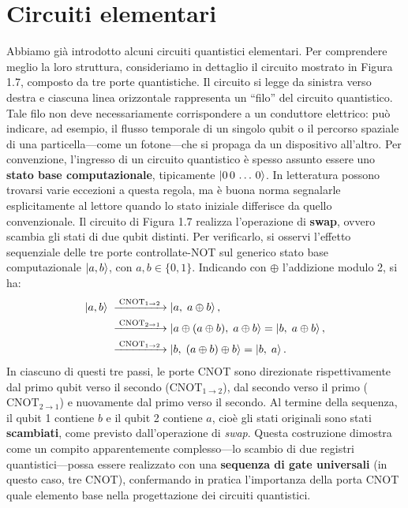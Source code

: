 \documentclass[a4paper,12pt]{report}
\theoremstyle{plain}
\begin{document}
\section{Circuiti elementari}
Abbiamo già introdotto alcuni circuiti quantistici elementari. Per comprendere meglio la loro struttura, consideriamo in dettaglio il circuito mostrato in Figura 1.7, composto da tre porte quantistiche. Il circuito si legge da sinistra verso destra e ciascuna linea orizzontale rappresenta un ``filo'' del circuito quantistico. Tale filo non deve necessariamente corrispondere a un conduttore elettrico: può indicare, ad esempio, il flusso temporale di un singolo qubit o il percorso spaziale di una particella---come un fotone---che si propaga da un dispositivo all'altro.
Per convenzione, l'ingresso di un circuito quantistico è spesso assunto essere uno \textbf{stato base computazionale}, tipicamente $\ket{0\,0\,\dots\,0}$. In letteratura possono trovarsi varie eccezioni a questa regola, ma è buona norma segnalarle esplicitamente al lettore quando lo stato iniziale differisce da quello convenzionale.
Il circuito di Figura 1.7 realizza l'operazione di \textbf{swap}, ovvero scambia gli stati di due qubit distinti. Per verificarlo, si osservi l'effetto sequenziale delle tre porte controllate-NOT sul generico stato base computazionale $\ket{a,b}$, con $a,b\in\{0,1\}$. Indicando con $\oplus$ l'addizione modulo 2, si ha:
\begin{equation}
\begin{aligned}
\ket{a,b} 
&\;\xrightarrow{\;\mathrm{CNOT}_{1\to2}\;} 
\ket{a,\;a \oplus b},\\
&\;\xrightarrow{\;\mathrm{CNOT}_{2\to1}\;} 
\ket{a \oplus (a \oplus b),\;a \oplus b}
   = \ket{b,\;a \oplus b},\\
&\;\xrightarrow{\;\mathrm{CNOT}_{1\to2}\;} 
\ket{b,\;(a \oplus b)\oplus b}
   = \ket{b,\;a}.
\end{aligned}
\end{equation}
In ciascuno di questi tre passi, le porte CNOT sono direzionate rispettivamente dal primo qubit verso il secondo ($\mathrm{CNOT}_{1\to2}$), dal secondo verso il primo ($\mathrm{CNOT}_{2\to1}$) e nuovamente dal primo verso il secondo. Al termine della sequenza, il qubit 1 contiene $b$ e il qubit 2 contiene $a$, cioè gli stati originali sono stati \textbf{scambiati}, come previsto dall'operazione di \textit{swap}.
Questa costruzione dimostra come un compito apparentemente complesso---lo scambio di due registri quantistici---possa essere realizzato con una \textbf{sequenza di gate universali} (in questo caso, tre CNOT), confermando in pratica l'importanza della porta CNOT quale elemento base nella progettazione dei circuiti quantistici.
\end{document}

